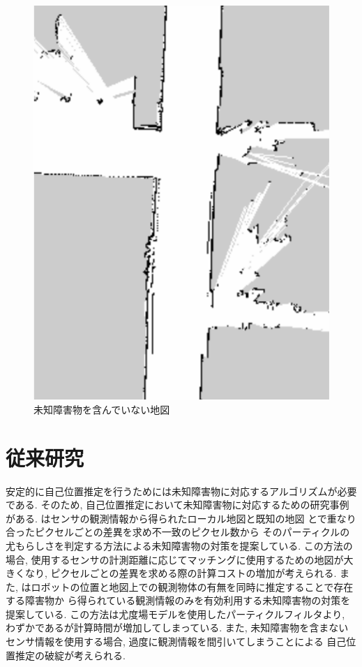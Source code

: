 \begin{figure}[htbp]
\begin{minipage}[b]{0.5\linewidth}
    \includegraphics[keepaspectratio, scale=0.32]{figs/known_obstacles.png}
    \caption{未知障害物を含んでいない地図}
    \label{fig:known-obstacles}
  \end{minipage}
\end{figure}


\section{従来研究}

安定的に自己位置推定を行うためには未知障害物に対応するアルゴリズムが必要である.
そのため, 自己位置推定において未知障害物に対応するための研究事例\cite{富沢}\cite{赤井}がある. 
\cite{富沢}はセンサの観測情報から得られたローカル地図と既知の地図
とで重なり合ったピクセルごとの差異を求め不一致のピクセル数から
そのパーティクルの尤もらしさを判定する方法による未知障害物の対策を提案している. 
この方法の場合, 使用するセンサの計測距離に応じてマッチングに使用するための地図が大きくなり, 
ピクセルごとの差異を求める際の計算コストの増加が考えられる. 
また, \cite{赤井}はロボットの位置と地図上での観測物体の有無を同時に推定することで存在する障害物か
ら得られている観測情報のみを有効利用する未知障害物の対策を提案している. 
この方法は尤度場モデルを使用したパーティクルフィルタより, わずかであるが計算時間が増加してしまっている. 
また, 未知障害物を含まないセンサ情報を使用する場合, 過度に観測情報を間引いてしまうことによる
自己位置推定の破綻が考えられる. 

